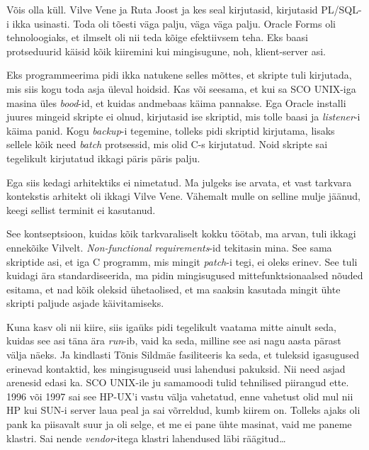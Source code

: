 Võis olla küll. Vilve Vene ja Ruta 
Joost ja kes seal kirjutasid, kirjutasid PL/SQL-i ikka 
usinasti. Toda oli tõesti väga palju, väga väga palju. Oracle Forms 
oli tehnoloogiaks, et ilmselt oli nii teda kõige efektiivsem teha. Eks 
 baasi protseduurid käisid kõik kiiremini kui mingisugune, noh, 
klient-server asi.


Eks programmeerima pidi ikka natukene selles mõttes, et skripte tuli kirjutada, 
mis  siis kogu toda asja üleval hoidsid. Kas või seesama, et kui sa SCO 
UNIX-iga masina üles \emph{bood}-id, et kuidas andmebaas käima pannakse. Ega 
 Oracle installi juures mingeid skripte ei olnud, kirjutasid ise 
 skriptid, mis tolle baasi ja \emph{listener}-i käima panid. Kogu 
\emph{backup}-i tegemine, tolleks pidi skriptid kirjutama, lisaks sellele kõik 
need \emph{batch} protsessid, mis olid C-s kirjutatud. 
Noid skripte  sai tegelikult kirjutatud ikkagi päris päris palju.


Ega siis kedagi arhitektiks ei nimetatud. Ma julgeks ise arvata, et vast 
tarkvara kontekstis arhitekt oli ikkagi Vilve Vene. 
Vähemalt  mulle on selline mulje jäänud, keegi sellist terminit ei kasutanud. 

See kontseptsioon, kuidas  kõik tarkvaraliselt kokku töötab, ma arvan, tuli 
ikkagi ennekõike Vilvelt. \emph{Non-functional requirements}-id tekitasin mina. 
See sama skriptide asi, et iga  C programm, mis mingit \emph{patch}-i tegi, ei 
oleks erinev. See tuli kuidagi ära standardiseerida,  ma pidin mingisugused  
mittefunktsionaalsed nõuded esitama, et nad kõik oleksid ühetaolised, et ma 
saaksin kasutada mingit ühte skripti paljude asjade käivitamiseks.


Kuna  kasv oli nii kiire, siis igaüks pidi tegelikult vaatama  mitte ainult 
seda, kuidas see asi täna ära \emph{run}-ib, vaid ka seda, milline see asi nagu 
aasta pärast välja näeks. Ja kindlasti Tõnis Sildmäe 
fasiliteeris ka seda, et tuleksid igasugused erinevad kontaktid, kes 
mingisuguseid uusi lahendusi pakuksid. Nii need 
asjad arenesid edasi ka. SCO UNIX-ile ju samamoodi  tulid tehnilised piirangud 
ette. 1996 või 1997 sai see HP-UX'i vastu välja vahetatud, enne 
vahetust olid mul nii HP kui SUN-i server laua peal ja sai võrreldud, kumb  
kiirem on. Tolleks ajaks oli pank ka piisavalt suur ja oli selge, et me  ei 
pane ühte masinat, vaid me paneme klastri. Sai nende \emph{vendor}-itega  
klastri lahendused läbi räägitud\ldots

